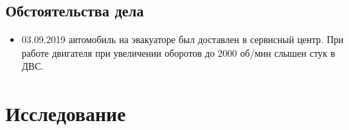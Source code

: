\subsection{Обстоятельства дела}
\begin{itemize}
\item 03.09.2019 автомобиль  на эвакуаторе был доставлен в сервисный центр. При работе двигателя при увеличении оборотов до 2000 об/мин слышен стук в ДВС. 
%
\end{itemize}
% 
%
%
\section{Исследование}
%
